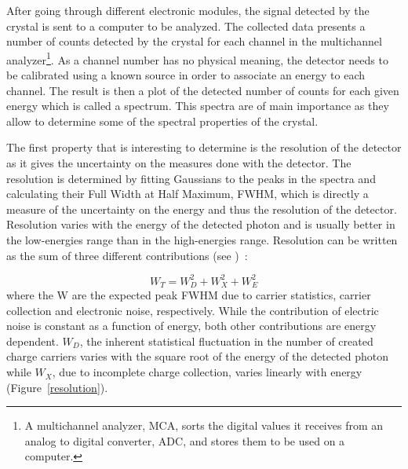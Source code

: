 \documentclass[11pt,a4paper]{article}
\begin{document}
After going through different electronic modules, the signal detected by the crystal is sent to a computer to be analyzed. The collected data presents a number of counts detected by the crystal for each channel in the multichannel analyzer\footnote{A multichannel analyzer, MCA, sorts the digital values it receives from an analog to digital converter, ADC, and stores them to be used on a computer.}. As a channel number has no physical meaning, the detector needs to be calibrated using a known source in order to associate an energy to each channel. The result is then a plot of the detected number of counts for each given energy which is called a spectrum. This spectra are of main importance as they allow to determine some of the spectral properties of the crystal.

The first property that is interesting to determine is the resolution of the detector as it gives the uncertainty on the measures done with the detector. The resolution is determined by fitting Gaussians to the peaks in the spectra and calculating their Full Width at Half Maximum, FWHM, which is directly a measure of the uncertainty on the energy and thus the resolution of the detector. Resolution varies with the energy of the detected photon and is usually better in the low-energies range than in the high-energies range. Resolution can be written as the sum of three different contributions (see \cite{Tsoulfanidis})~:

\begin{equation}
W_T = W_D^2 + W_X^2 + W_E^2
\end{equation}
where the W are the expected peak FWHM due to carrier statistics, carrier collection and electronic noise, respectively. While the contribution of electric noise is constant as a function of energy, both other contributions are energy dependent. $W_D$, the inherent statistical fluctuation in the number of created charge carriers varies with the square root of the energy of the detected photon while $W_X$, due to incomplete charge collection, varies linearly with energy (Figure~\ref{resolution}).
\end{document}
